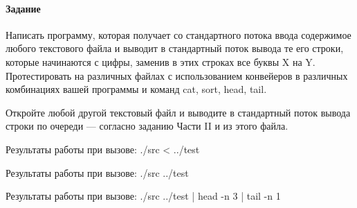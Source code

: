 \paragraph{Задание}
Написать программу, которая получает со стандартного потока ввода
содержимое любого текстового файла и выводит в стандартный поток вывода те его строки,
которые начинаются с цифры, заменив в этих строках все буквы X на Y. Протестировать на
различных файлах с использованием конвейеров в различных комбинациях вашей программы и
команд cat, sort, head, tail.

Откройте любой другой текстовый файл и выводите в стандартный поток
вывода строки по очереди --- согласно заданию Части II и из этого файла.



Результаты работы при вызове: {\ttfamily ./src < ../test}

Результаты работы при вызове: {\ttfamily ./src ../test}

Результаты работы при вызове: {\ttfamily ./src ../test | head -n 3 | tail -n 1}
